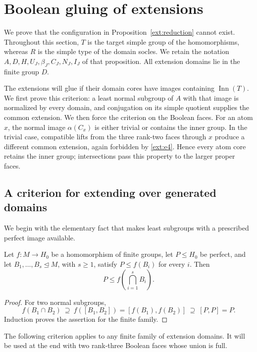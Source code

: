 \section{Boolean gluing of extensions}
\label{glue:section}

We prove that the configuration in Proposition~\ref{ext:reduction}
cannot exist.  Throughout this section, $T$ is the target simple group
of the homomorphisms, whereas $R$ is the simple type of the domain
socles.  We retain the notation $A,D,H,U_J,\beta_J,C_J,N_J,I_J$ of
that proposition.  All extension domains lie in the finite group $D$.

The extensions will glue if their domain cores have images containing
$\operatorname{Inn}(T)$.  We first prove this criterion: a least normal
subgroup of $A$ with that image is normalized by every domain, and
conjugation on its simple quotient supplies the common extension.
We then force the criterion on the Boolean faces.  For an atom $x$,
the normal image $\alpha(C_x)$ is either trivial or contains the inner
group.  In the trivial case, compatible lifts from the three rank-two
faces through $x$ produce a different common extension, again forbidden
by \ref{ext:e4}.  Hence every atom core retains the inner group;
intersections pass this property to the larger proper faces.

\subsection{A criterion for extending over generated domains}

We begin with the elementary fact that makes least subgroups with a
prescribed perfect image available.

\begin{lemma}
\label{glue:perfect-intersections}
Let $f:M\to H_0$ be a homomorphism of finite groups, let $P\le H_0$
be perfect, and let $B_1,\ldots,B_s\trianglelefteq M$, with $s\ge1$, satisfy
$P\le f(B_i)$ for every $i$.  Then
\[
                  P\le f\left(\bigcap_{i=1}^s B_i\right).
\]
\end{lemma}
\begin{proof}
For two normal subgroups,
\[
 f(B_1\cap B_2)\ \supseteq\ f([B_1,B_2])
   =[f(B_1),f(B_2)]\ \supseteq\ [P,P]=P.
\]
Induction proves the assertion for the finite family.
\end{proof}

The following criterion applies to any finite family of extension
domains.  It will be used at the end with two rank-three Boolean faces
whose union is full.

